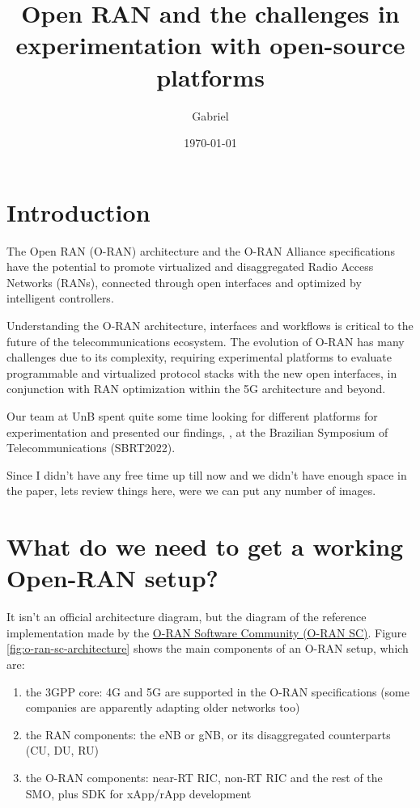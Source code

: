 \documentclass{article}
\title{Open RAN and the challenges in experimentation with open-source platforms}
\author{Gabriel}
\date{\today}
\begin{document}
\maketitle

\begin{abstract}
\end{abstract}

\section{Introduction}
    The Open RAN (O-RAN) architecture and the O-RAN Alliance specifications
    have the potential to promote virtualized and disaggregated Radio Access
    Networks (RANs), connected through open interfaces and optimized by
    intelligent controllers.

    Understanding the O-RAN architecture, interfaces and workflows is critical
    to the future of the telecommunications ecosystem. The evolution of O-RAN has
    many challenges due to its complexity, requiring experimental platforms to
    evaluate programmable and virtualized protocol stacks with the new open interfaces,
    in conjunction with RAN optimization within the 5G architecture and beyond.

    Our team at UnB spent quite some time looking for different platforms for
    experimentation and presented our findings, \cite{Solis_2022}, at the
    Brazilian Symposium of Telecommunications (SBRT2022).

    Since I didn't have any free time up till now and we didn't have enough space in the
    paper, lets review things here, were we can put any number of images.


\section{What do we need to get a working Open-RAN setup?}

    It isn't an official architecture diagram, but the diagram of the reference implementation
    made by the \href{https://wiki.o-ran-sc.org/display/OAM/OAM+Architecture#OAMArchitecture-IntegrationintoSMO}{O-RAN Software Community (O-RAN SC)}.
    Figure \ref{fig:o-ran-sc-architecture} shows the main components of an O-RAN setup, which are:
    \begin{enumerate}
        \item the 3GPP core: 4G and 5G are supported in the O-RAN specifications (some companies are apparently adapting older networks too)
        \item the RAN components: the eNB or gNB, or its disaggregated counterparts (CU, DU, RU)
        \item the O-RAN components: near-RT RIC, non-RT RIC and the rest of the SMO, plus SDK for xApp/rApp development
    \end{enumerate}
\end{document}
